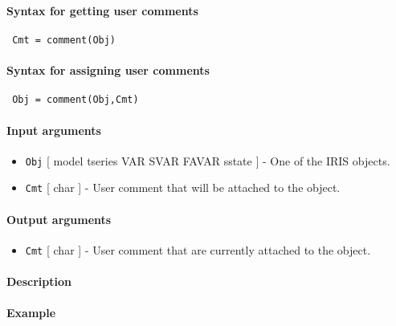 


	\paragraph{Syntax for getting user comments}
 
 \begin{verbatim}
 Cmt = comment(Obj)
 \end{verbatim}
 
 \paragraph{Syntax for assigning user comments}
 
 \begin{verbatim}
 Obj = comment(Obj,Cmt)
 \end{verbatim}
 
 \paragraph{Input arguments}
 
 \begin{itemize}
 \item
   \texttt{Obj} {[} model \textbar{} tseries \textbar{} VAR \textbar{}
   SVAR \textbar{} FAVAR \textbar{} sstate {]} - One of the IRIS objects.
 \item
   \texttt{Cmt} {[} char {]} - User comment that will be attached to the
   object.
 \end{itemize}
 
 \paragraph{Output arguments}
 
 \begin{itemize}
 \item
   \texttt{Cmt} {[} char {]} - User comment that are currently attached
   to the object.
 \end{itemize}
 
 \paragraph{Description}
 
 \paragraph{Example}


